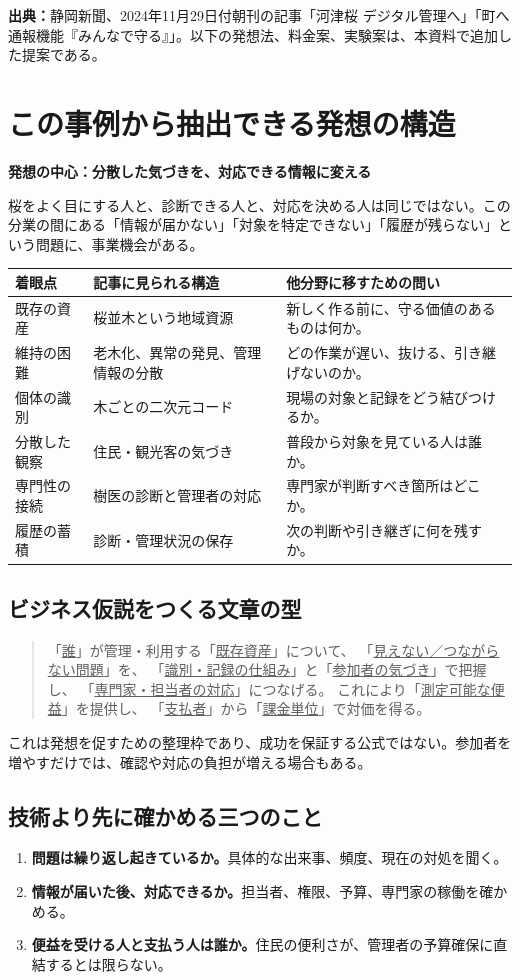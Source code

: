\documentclass[a4paper,11pt]{ltjsarticle}
\newcommand{\lead}[1]{\noindent\textcolor{accent}{\textbf{#1}}\par}
\begin{document}
{\small\textbf{出典：}静岡新聞、2024年11月29日付朝刊の記事「河津桜 デジタル管理へ」「町へ通報機能『みんなで守る』」。以下の発想法、料金案、実験案は、本資料で追加した提案である。}

\clearpage
\section{この事例から抽出できる発想の構造}
\lead{発想の中心：分散した気づきを、対応できる情報に変える}
桜をよく目にする人と、診断できる人と、対応を決める人は同じではない。この分業の間にある「情報が届かない」「対象を特定できない」「履歴が残らない」という問題に、事業機会がある。

\noindent\begin{tabularx}{\linewidth}{p{26mm}YY}
\toprule
着眼点 & 記事に見られる構造 & 他分野に移すための問い\\
\midrule
既存の資産 & 桜並木という地域資源 & 新しく作る前に、守る価値のあるものは何か。\\
維持の困難 & 老木化、異常の発見、管理情報の分散 & どの作業が遅い、抜ける、引き継げないのか。\\
個体の識別 & 木ごとの二次元コード & 現場の対象と記録をどう結びつけるか。\\
分散した観察 & 住民・観光客の気づき & 普段から対象を見ている人は誰か。\\
専門性の接続 & 樹医の診断と管理者の対応 & 専門家が判断すべき箇所はどこか。\\
履歴の蓄積 & 診断・管理状況の保存 & 次の判断や引き継ぎに何を残すか。\\
\bottomrule
\end{tabularx}

\subsection{ビジネス仮説をつくる文章の型}
\begin{quote}
「\underline{誰}」が管理・利用する「\underline{既存資産}」について、
「\underline{見えない／つながらない問題}」を、
「\underline{識別・記録の仕組み}」と「\underline{参加者の気づき}」で把握し、
「\underline{専門家・担当者の対応}」につなげる。
これにより「\underline{測定可能な便益}」を提供し、
「\underline{支払者}」から「\underline{課金単位}」で対価を得る。
\end{quote}
これは発想を促すための整理枠であり、成功を保証する公式ではない。参加者を増やすだけでは、確認や対応の負担が増える場合もある。

\subsection{技術より先に確かめる三つのこと}
\begin{enumerate}
\item \textbf{問題は繰り返し起きているか。}具体的な出来事、頻度、現在の対処を聞く。
\item \textbf{情報が届いた後、対応できるか。}担当者、権限、予算、専門家の稼働を確かめる。
\item \textbf{便益を受ける人と支払う人は誰か。}住民の便利さが、管理者の予算確保に直結するとは限らない。
\end{enumerate}
\end{document}
